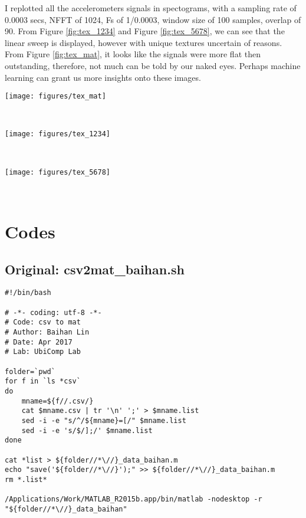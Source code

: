 \documentclass{sigchi}
\begin{document}
I replotted all the accelerometers signals in spectograms, with a sampling rate of 0.0003 secs, NFFT of 1024, Fs of 1/0.0003, window size of 100 samples, overlap of 90. From Figure \ref{fig:tex_1234} and Figure \ref{fig:tex_5678}, we can see that the linear sweep is displayed, however with unique textures uncertain of reasons. From Figure \ref{fig:tex_mat}, it looks like the signals were more flat then outstanding, therefore, not much can be told by our naked eyes. Perhaps machine learning can grant us more insights onto these images.

\begin{figure*}
  \centering
  \texttt{[image: figures/tex\_mat]}
  \caption{Spectograms for the four experiments previously on the signal difference hitting with different materials.}
    ~\label{fig:tex_mat}
\end{figure*}

\begin{figure*}
  \centering
  \texttt{[image: figures/tex\_1234]}
  \caption{Spectograms for the four experiments previously in Pose 1 through 4.}
    ~\label{fig:tex_1234}
\end{figure*}

\begin{figure*}
  \centering
  \texttt{[image: figures/tex\_5678]}
  \caption{Spectograms for the four experiments previously in Pose 5 through 8.}
    ~\label{fig:tex_5678}
\end{figure*}

\section{Codes}

\subsection{Original: csv2mat\_baihan.sh}\label{ss:csv2mat}
\begin{lstlisting}
#!/bin/bash

# -*- coding: utf-8 -*-
# Code: csv to mat
# Author: Baihan Lin
# Date: Apr 2017
# Lab: UbiComp Lab

folder=`pwd`
for f in `ls *csv`
do
    mname=${f//.csv/}
    cat $mname.csv | tr '\n' ';' > $mname.list 
    sed -i -e "s/^/${mname}=[/" $mname.list
    sed -i -e 's/$/];/' $mname.list
done

cat *list > ${folder//*\//}_data_baihan.m
echo "save('${folder//*\//}');" >> ${folder//*\//}_data_baihan.m
rm *.list*

/Applications/Work/MATLAB_R2015b.app/bin/matlab -nodesktop -r "${folder//*\//}_data_baihan"
\end{lstlisting}
\end{document}
